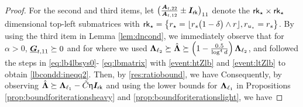 \begin{proof}
\smallskip
For the second and third items,  let  $\big( \tfrac{\boldsymbol{A}_{t,22}}{ \boldsymbol{A}_{t,12} } \pm \boldsymbol{I}_{\mathsf{rk}} \big)_{11}$ denote the $\mathsf{rk}_{\star} \times \mathsf{rk}_{\star}$ dimensional top-left submatrices with  $\mathsf{rk}_{\star} = \big \{ r_{\star} =  \lfloor  r_s \big(1 - \delta   \big) \wedge r \rfloor,  r_{u_\star} =  r_s \big \}$.   By using the third item in Lemma \ref{lem:dncond}, we immediately observe that  for $\alpha > 0$,    $\underline{\boldsymbol{G}}_{t,11} \succeq 0$ and
 for 
where we  used   $ \boldsymbol{\Lambda}_{\ell_2} \succeq \hat{\boldsymbol{\Lambda}}  \succeq   \left(1 - \tfrac{0.5}{\log^4 d} \right) \boldsymbol{\Lambda}_{\ell_2}$, and  followed the steps in \eqref{eq:lb4lbsys0}- \eqref{eq:lbmatrix} with  \ref{event:htZlb} and \ref{event:ltZlb}  to obtain \eqref{lbcondd:ineqq2}. Then,  by \ref{res:ratiobound}, we have
Consequently, by observing $\hat{\boldsymbol{\Lambda}} \succeq \boldsymbol{\Lambda}_{\ell_1} - \tilde{C} \upeta \boldsymbol{I}_{\mathsf{rk}}$ and using the lower bounds for $\boldsymbol{\Lambda}_{\ell_1}$ in Propositions \ref{prop:boundforiterationsheavy} and \ref{prop:boundforiterationslight}, we have
\end{proof}
